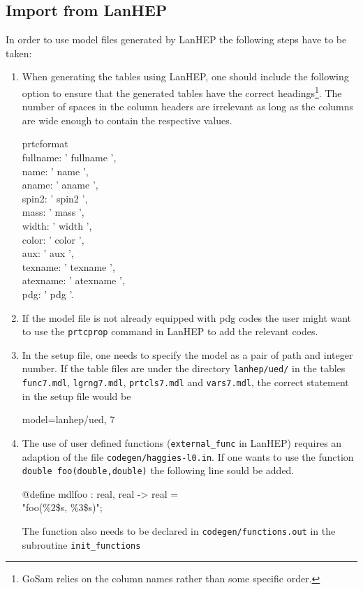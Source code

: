 \documentclass[11pt,a4paper]{refrep}
\newcommand{\gosamversion}{{3{.}0}}
\newcommand{\gosamv}[1][\gosamversion]{{\sc GoSam}\xspace}
\begin{document}
\subsection{Import from LanHEP}
In order to use model files generated by LanHEP the following steps
have to be taken:
\begin{enumerate}
\item When generating the tables using LanHEP, one should include the
   following option to ensure that the generated tables have the correct
   headings\footnote{\gosamv{} relies on the column names rather than
   some specific order.}. The number of spaces in the column headers are
   irrelevant as long as the columns are wide enough to contain the
   respective values.
\begin{example}
   prtcformat\\
      fullname: '  fullname  ',\\
      name:     '  name   ',\\
      aname:    '  aname  ',\\
      spin2:    '  spin2  ',\\
      mass:     '  mass  ',\\
      width:    '  width  ',\\
      color:    '  color  ',\\
      aux:      '  aux  ',\\
      texname:  '      texname      ',\\
      atexname: '     atexname      ',\\
      pdg:      '  pdg   '.
\end{example}
\item If the model file is not already equipped with pdg codes
   the user might want to use the \verb!prtcprop! command in
   LanHEP to add the relevant codes.
\item In the setup file, one needs to specify the model as a pair
   of path and integer number. If the table files are under the directory
   \texttt{lanhep/ued/} in the tables \texttt{func7.mdl}, \texttt{lgrng7.mdl},
   \texttt{prtcls7.mdl} and \texttt{vars7.mdl}, the correct statement in
   the setup file would be
\begin{example}
   model=lanhep/ued, 7
\end{example}
\item The use of user defined functions (\texttt{external\_func} in LanHEP)
   requires an adaption of the file \texttt{codegen/haggies-l0.in}. If one
   wants to use the function \texttt{double foo(double,double)} the
   following line sould be added.
\begin{example}
@define mdlfoo : real, real -> real =\\ "foo(\%2\$s, \%3\$s)";
\end{example}
   The function also needs to be declared in \texttt{codegen/functions.out}
   in the subroutine \texttt{init\_functions}
\end{enumerate}
\end{document}
